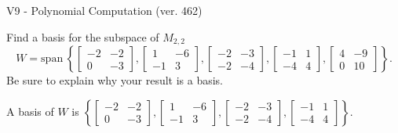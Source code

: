 \begin{exercise}
  \begin{exerciseTitle}V9 - Polynomial Computation (ver. 462)\end{exerciseTitle}
  \begin{exerciseStatement}
    Find a basis for the subspace of \(M_{2,2}\) 
\[W=\mathrm{span}\ \left\{\left[\begin{array}{cc}
-2 & -2 \\
0 & -3
\end{array}\right] , \left[\begin{array}{cc}
1 & -6 \\
-1 & 3
\end{array}\right] , \left[\begin{array}{cc}
-2 & -3 \\
-2 & -4
\end{array}\right] , \left[\begin{array}{cc}
-1 & 1 \\
-4 & 4
\end{array}\right] , \left[\begin{array}{cc}
4 & -9 \\
0 & 10
\end{array}\right]\right\}.\]
 Be sure to explain why your result is a basis.


  \end{exerciseStatement}
  \begin{exerciseAnswer}
   A basis of \(W\) is  \(\left\{\left[\begin{array}{cc}
-2 & -2 \\
0 & -3
\end{array}\right] , \left[\begin{array}{cc}
1 & -6 \\
-1 & 3
\end{array}\right] , \left[\begin{array}{cc}
-2 & -3 \\
-2 & -4
\end{array}\right] , \left[\begin{array}{cc}
-1 & 1 \\
-4 & 4
\end{array}\right]\right\}\).
  


  \end{exerciseAnswer}
\end{exercise}